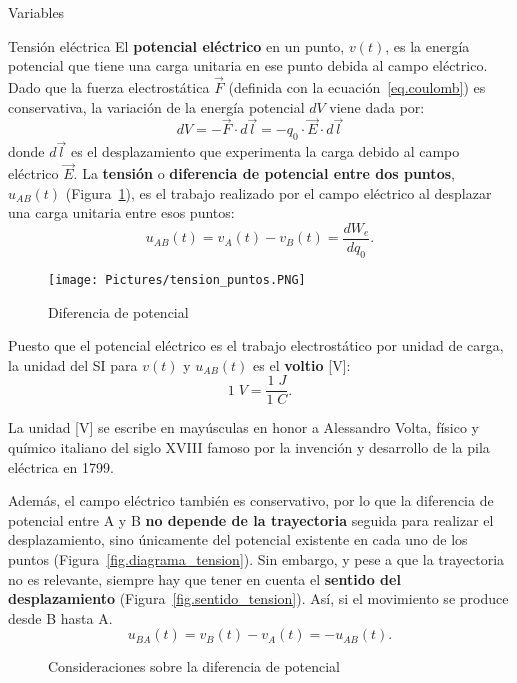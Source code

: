\documentclass[11pt]{book} %
\makeatletter
\numberwithin{dummy}{section}
\theoremstyle{ocrenumbox}
\theoremstyle{blacknumex}
\theoremstyle{blacknumbox}
\theoremstyle{ocrenum}
\newenvironment{remark}{\par\vspace{10pt}\small %
\begin{list}{}{
\leftmargin=35pt %
\rightmargin=25pt}\item\ignorespaces %
\makebox[-2.5pt]{\begin{tikzpicture}[overlay]
\node[draw=ocre!60,line width=1pt,circle,fill=ocre!25,font=\sffamily\bfseries,inner sep=2pt,outer sep=0pt] at (-15pt,0pt){\textcolor{ocre}{N}};\end{tikzpicture}} %
\advance\baselineskip -1pt}{\end{list}\vskip5pt} %
\renewcommand{\subsection}{\@startsection {subsection}{2}{\z@}
{-3ex \@plus -0.1ex \@minus -.4ex}
{0.5ex \@plus.2ex }
{\normalfont\sffamily\bfseries}}
\renewcommand{\subsubsection}{\@startsection {subsubsection}{3}{\z@}
{-2ex \@plus -0.1ex \@minus -.2ex}
{.2ex \@plus.2ex }
{\normalfont\small\sffamily\bfseries}}
\newlength\esp
\makeatother
\begin{document}
	\subsection{Variables}
	\subsubsection{Tensión eléctrica}
	El \textbf{potencial eléctrico} en un punto, $v(t)$,  es la energía potencial que tiene una carga unitaria en ese punto debida al campo eléctrico. Dado que la fuerza electrostática $\vec{F}$ (definida con la ecuación~\eqref{eq.coulomb}) es conservativa, la variación de la energía potencial $dV$ viene dada por:
	\begin{equation*}
		dV=-\Vec{F}\cdot d\vec{l}=-q_0\cdot \Vec{E}\cdot d\vec{l}
	\end{equation*}
	donde $d\vec{l}$ es el desplazamiento que experimenta la carga debido al campo eléctrico $\Vec{E}$. La \textbf{tensión} o \textbf{diferencia de potencial entre dos puntos}, $u_{AB}(t)$ (Figura~\ref{fig.tension_puntos}), es el trabajo realizado por el campo eléctrico al desplazar una carga unitaria entre esos puntos: 
	\begin{equation*}
		u_{AB}(t) = v_A(t) - v_B(t) = \frac{dW_{e}}{dq_0}.
	\end{equation*}
	\begin{figure}[htbp]
		\centering
		\texttt{[image: Pictures/tension\_puntos.PNG]}
		\caption{Diferencia de potencial}
		\label{fig.tension_puntos}
	\end{figure}
	
	Puesto que el potencial eléctrico es el trabajo electrostático por unidad de carga, la unidad del SI para $v(t)$ y $u_{AB}(t)$ es el \textbf{voltio} [V]:
	\begin{equation*}
		1\;V=\dfrac{1\;J}{1\;C}.
	\end{equation*}
	\begin{remark}
		La unidad [V] se escribe en mayúsculas en honor a Alessandro Volta, físico y químico italiano del siglo XVIII famoso por la invención y desarrollo de la pila eléctrica en 1799.
	\end{remark}
	Además, el campo eléctrico también es conservativo, por lo que la diferencia de potencial entre A y B \textbf{no depende de la trayectoria} seguida para realizar el desplazamiento, sino únicamente del potencial existente en cada uno de los puntos (Figura~\ref{fig.diagrama_tension}). Sin embargo, y pese a que la trayectoria no es relevante, siempre hay que tener en cuenta el \textbf{sentido del desplazamiento} (Figura~\ref{fig.sentido_tension}). Así, si el movimiento se produce desde B hasta A.
	\begin{equation*}
		u_{BA}(t) = v_B(t) - v_A(t) = - u_{AB}(t). 
	\end{equation*}
	\begin{figure}[htbp]
		\centering
		\hfil
		\caption{Consideraciones sobre la diferencia de potencial}
	\end{figure}
	
\end{document}
